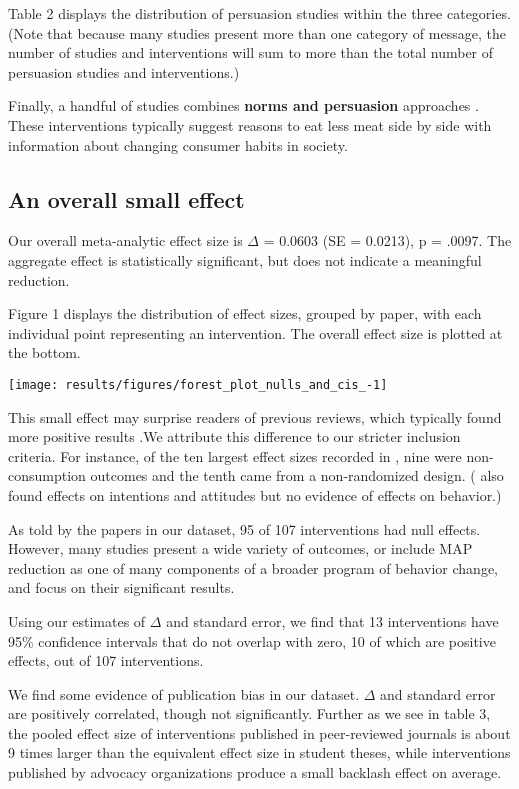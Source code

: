 \documentclass[sn-nature,pdflatex]{sn-jnl}
\begin{document}
Table 2 displays the distribution of persuasion studies within the three
categories. (Note that because many studies present more than one
category of message, the number of studies and interventions will sum to
more than the total number of persuasion studies and interventions.)

Finally, a handful of studies combines \textbf{norms and persuasion}
approaches
\citep{hennessy2016, carfora2023, lacroix2020, mattson2020, piester2020}.
These interventions typically suggest reasons to eat less meat side by
side with information about changing consumer habits in society.

\subsection{An overall small effect}\label{sec2.2}

Our overall meta-analytic effect size is \(\Delta\) = 0.0603 (SE =
0.0213), p = .0097. The aggregate effect is statistically significant,
but does not indicate a meaningful reduction.

Figure 1 displays the distribution of effect sizes, grouped by paper,
with each individual point representing an intervention. The overall
effect size is plotted at the bottom.

\texttt{[image: results/figures/forest\_plot\_nulls\_and\_cis\_-1]}

This small effect may surprise readers of previous reviews, which
typically found more positive results
\citep{mathur2021meta, meier2022, chang2023}.We attribute this
difference to our stricter inclusion criteria. For instance, of the ten
largest effect sizes recorded in \citep{mathur2021effectiveness}, nine
were non-consumption outcomes and the tenth came from a non-randomized
design. (\citep{bianchi2018conscious} also found effects on intentions
and attitudes but no evidence of effects on behavior.)

As told by the papers in our dataset, 95 of 107 interventions had null
effects. However, many studies present a wide variety of outcomes, or
include MAP reduction as one of many components of a broader program of
behavior change, and focus on their significant results.

Using our estimates of \(\Delta\) and standard error, we find that 13
interventions have 95\% confidence intervals that do not overlap with
zero, 10 of which are positive effects, out of 107 interventions.

We find some evidence of publication bias in our dataset. \(\Delta\) and
standard error are positively correlated, though not significantly.
Further as we see in table 3, the pooled effect size of interventions
published in peer-reviewed journals is about 9 times larger than the
equivalent effect size in student theses, while interventions published
by advocacy organizations produce a small backlash effect on average.
\end{document}
